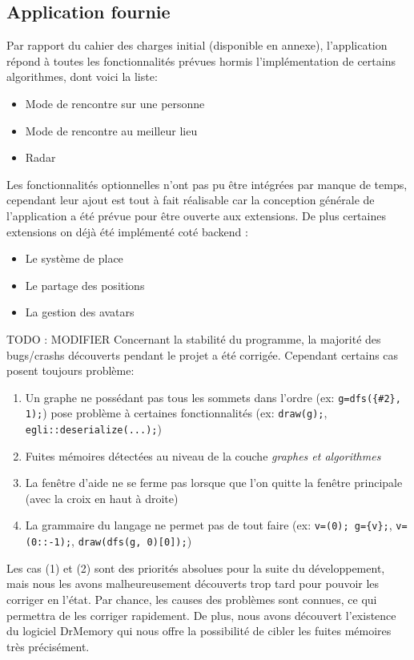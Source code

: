 \documentclass[french]{article}
\begin{document}
		\subsection{Application fournie}			
		Par rapport du cahier des charges initial (disponible en annexe), l'application répond à toutes les fonctionnalités prévues hormis l'implémentation de certains algorithmes, dont voici la liste:
		\begin{itemize}
			\item Mode de rencontre sur une personne
			\item Mode de rencontre au meilleur lieu
			\item Radar
		\end{itemize}
		Les fonctionnalités optionnelles n'ont pas pu être intégrées par manque de temps, cependant leur ajout est tout à fait réalisable car la conception générale de l'application a été prévue pour être ouverte aux extensions. De plus certaines extensions on déjà été implémenté coté backend : 
		\begin{itemize}
			\item Le système de place
			\item Le partage des positions
			\item La gestion des avatars
		\end{itemize}
		
		TODO : MODIFIER
		Concernant la stabilité du programme, la majorité des bugs/crashs découverts pendant le projet a été corrigée. Cependant certains cas posent toujours problème:
		\begin{enumerate}
			\item Un graphe ne possédant pas tous les sommets dans l'ordre (ex: \texttt{g=dfs(\{\#2\}, 1);}) pose problème à certaines fonctionnalités (ex: \texttt{draw(g);}, \texttt{egli::deserialize(...);})
			\item Fuites mémoires détectées au niveau de la couche \textit{graphes et algorithmes}
			\item La fenêtre d'aide ne se ferme pas lorsque que l'on quitte la fenêtre principale (avec la croix en haut à droite)
			\item La grammaire du langage ne permet pas de tout faire (ex: \texttt{v=(0); g=\{v\};}, \texttt{v=(0::-1);}, \texttt{draw(dfs(g, 0)[0]);})
		\end{enumerate}
		Les cas (1) et (2) sont des priorités absolues pour la suite du développement, mais nous les avons malheureusement découverts trop tard pour pouvoir les corriger en l'état. Par chance, les causes des problèmes sont connues, ce qui permettra de les corriger rapidement. De plus, nous avons découvert l'existence du logiciel DrMemory \cite{drmemory} qui nous offre la possibilité de cibler les fuites mémoires très précisément.\\
		
\end{document}
